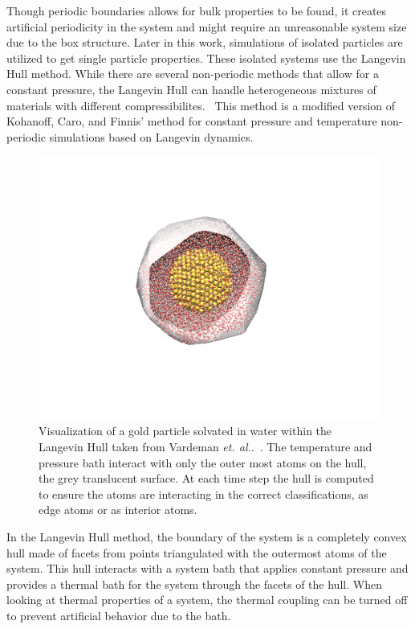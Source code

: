 Though periodic boundaries allows for bulk properties to be found, it creates artificial periodicity in the system and might require an unreasonable system size due to the box structure. Later in this work, simulations of isolated particles are utilized to get single particle properties. 
These isolated systems use the Langevin Hull method. While there are several non-periodic methods that allow for a constant pressure, the Langevin Hull can handle heterogeneous mixtures of materials with different compressibilites.~\cite{Vardeman2011} This method is a modified version of Kohanoff, Caro, and Finnis' method for constant pressure and temperature non-periodic simulations based on Langevin dynamics.~\cite{Kohanoff:2005qm, Baltazar:2006ru} 

\begin{figure}
    \centering
    \includegraphics[scale=1]{figures/hull.pdf}
    \caption{Visualization of a gold particle solvated in water within the Langevin Hull taken from Vardeman \textit{et. al.}.~\cite{Vardeman2011}. The temperature and pressure bath interact with only the outer most atoms on the hull, the grey translucent surface. At each time step the hull is computed to ensure the atoms are interacting in the correct classifications, as edge atoms or as interior atoms.}
    \label{fig:hull}
\end{figure}

In the Langevin Hull method, the boundary of the system is a completely convex hull made of facets from points triangulated with the outermost atoms of the system. This hull interacts with a system bath that applies constant pressure and provides a thermal bath for the system through the facets of the hull. When looking at thermal properties of a system, the thermal coupling can be turned off to prevent artificial behavior due to the bath.


